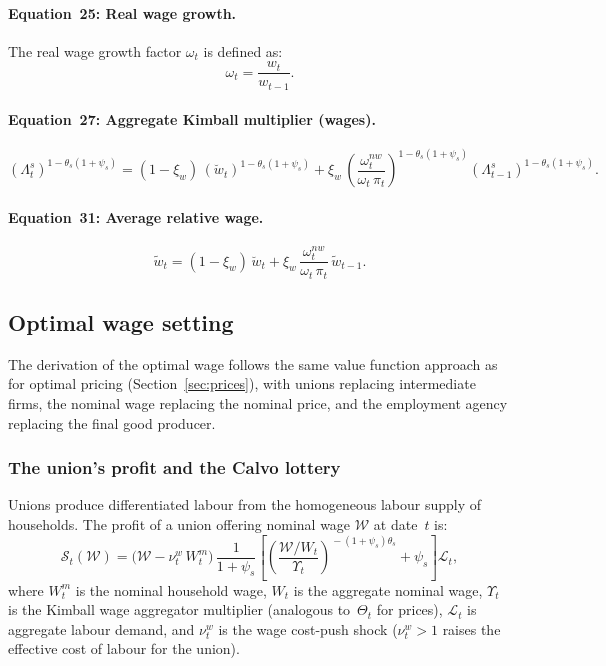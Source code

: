 \documentclass[11pt,a4paper]{article}
\begin{document}
\paragraph{Equation~25: Real wage growth.}
The real wage growth factor $\omega_t$ is defined as:
\begin{equation}\label{eq:eq25}\tag{Eq.~25}
  \boxed{\omega_t = \frac{w_t}{w_{t-1}}.}
\end{equation}

\paragraph{Equation~27: Aggregate Kimball multiplier (wages).}
\begin{equation}\label{eq:eq27}\tag{Eq.~27}
  \boxed{
  (\Lambda^s_t)^{1-\theta_s(1+\psi_s)}
  = (1-\xi_w)\,(\breve w_t)^{1-\theta_s(1+\psi_s)}
  + \xi_w\,
    \left(\frac{\omega^{nw}_t}{\omega_t\,\pi_t}\right)^{\!1-\theta_s(1+\psi_s)}
    \!(\Lambda^s_{t-1})^{1-\theta_s(1+\psi_s)}.}
\end{equation}

\paragraph{Equation~31: Average relative wage.}
\begin{equation}\label{eq:eq31}\tag{Eq.~31}
  \boxed{
  \tilde w_t = (1-\xi_w)\,\breve w_t
  + \xi_w\,\frac{\omega^{nw}_t}{\omega_t\,\pi_t}\,\tilde w_{t-1}.}
\end{equation}

\subsection{Optimal wage setting}

The derivation of the optimal wage follows the same value function
approach as for optimal pricing
(Section~\ref{sec:prices}), with unions replacing intermediate
firms, the nominal wage replacing the nominal price, and the employment
agency replacing the final good producer.

\subsubsection{The union's profit and the Calvo lottery}

Unions produce differentiated labour from the homogeneous labour supply
of households. The profit of a union offering nominal wage
$\mathcal{W}$ at date~$t$ is:
\[
  \mathscr{S}_t(\mathcal{W})
  = \bigl(\mathcal{W} - \nu^w_t\,W^m_t\bigr)\,
  \frac{1}{1+\psi_s}
  \left[\left(\frac{\mathcal{W}/W_t}{\Upsilon_t}\right)^{\!-(1+\psi_s)\theta_s}
    + \psi_s\right]\mathcal{L}_t,
\]
where $W^m_t$ is the nominal household wage, $W_t$ is the aggregate
nominal wage, $\Upsilon_t$ is the Kimball wage aggregator multiplier
(analogous to~$\Theta_t$ for prices), $\mathcal{L}_t$ is aggregate
labour demand, and $\nu^w_t$ is the wage cost-push shock
($\nu^w_t > 1$ raises the effective cost of labour for the union).
\end{document}
